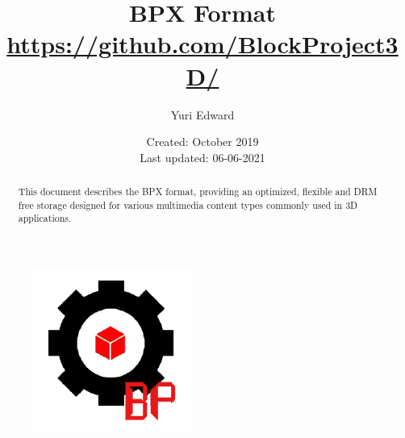 \documentclass{article}
\title{
    \huge \textbf{BPX Format} \\
    \large \url{https://github.com/BlockProject3D/}
}
\author{Yuri Edward}
\date{
	Created: October 2019 \\
	Last updated: 06-06-2021
}
\begin{document}
\maketitle

\begin{figure}[h!]
    \centering
    \includegraphics[scale=1.1]{logo}
    \label{fig:logo}
\end{figure}

\newpage

\begin{abstract}
    This document describes the BPX format, providing an optimized, flexible and DRM \cite{DRM} free storage designed for various multimedia content types commonly used in 3D applications.
\end{abstract}
\doclicenseThis
















\end{document}

